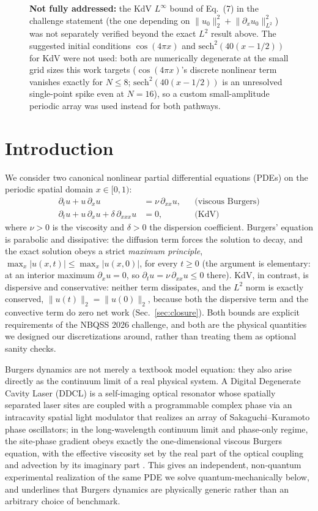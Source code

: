 \documentclass[aps,pra,twocolumn,notitlepage,superscriptaddress,floatfix,10pt]{revtex4-2}
\newcommand{\norm}[1]{\lVert #1 \rVert}
\begin{document}
\begin{figure}[t]
{\begin{minipage}{0.96\textwidth}
\textbf{Not fully addressed:} the KdV $L^\infty$ bound of Eq.~(7) in the challenge statement (the one
depending on $\norm{u_0}_2^2+\norm{\partial_xu_0}_{L^2}^2$) was not separately verified beyond the
exact $L^2$ result above. The suggested initial conditions $\cos(4\pi x)$ and
$\mathrm{sech}^2(40(x-1/2))$ for KdV were not used: both are numerically degenerate at the small grid
sizes this work targets ($\cos(4\pi x)$'s discrete nonlinear term vanishes exactly for $N\le8$;
$\mathrm{sech}^2(40(x-1/2))$ is an unresolved single-point spike even at $N=16$), so a custom
small-amplitude periodic array was used instead for both pathways.
\end{minipage}}
\end{figure}

\section{Introduction}
\label{sec:intro}

We consider two canonical nonlinear partial differential equations (PDEs) on the periodic spatial
domain $x\in[0,1)$:
\begin{align}
\partial_t u + u\,\partial_x u &= \nu\,\partial_{xx}u, &&\text{(viscous Burgers)}\label{eq:burgers}\\
\partial_t u + u\,\partial_x u + \delta\,\partial_{xxx}u &= 0, &&\text{(KdV)}\label{eq:kdv}
\end{align}
where $\nu>0$ is the viscosity and $\delta>0$ the dispersion coefficient. Burgers' equation is
parabolic and dissipative: the diffusion term forces the solution to decay, and the exact solution
obeys a strict \emph{maximum principle}, $\max_x|u(x,t)|\le\max_x|u(x,0)|$, for every $t\ge0$
(the argument is elementary: at an interior maximum $\partial_x u=0$, so
$\partial_t u=\nu\,\partial_{xx}u\le0$ there). KdV, in contrast, is dispersive and conservative:
neither term dissipates, and the $L^2$ norm is exactly conserved,
$\norm{u(t)}_2=\norm{u(0)}_2$, because both the dispersive term and the convective term do zero net
work (Sec.~\ref{sec:closure}). Both bounds are explicit requirements of the NBQSS 2026 challenge, and
both are the physical quantities we designed our discretizations around, rather than treating them as
optional sanity checks.

Burgers dynamics are not merely a textbook model equation: they also arise directly as the continuum
limit of a real physical system. A Digital Degenerate Cavity Laser (DDCL) is a self-imaging optical
resonator whose spatially separated laser sites are coupled with a programmable complex phase via an
intracavity spatial light modulator that realizes an array of Sakaguchi--Kuramoto phase oscillators;
in the long-wavelength continuum limit and phase-only regime, the site-phase gradient obeys exactly
the one-dimensional viscous Burgers equation, with the effective viscosity set by the real part of the
optical coupling and advection by its imaginary part \cite{DDCL2026}. This gives an independent,
non-quantum experimental realization of the same PDE we solve quantum-mechanically below, and
underlines that Burgers dynamics are physically generic rather than an arbitrary choice of benchmark.
\end{document}
